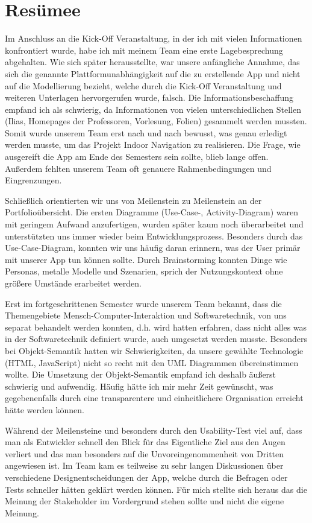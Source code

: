 \chapter{Resümee}

Im Anschluss an die Kick-Off Veranstaltung, in der ich mit vielen Informationen konfrontiert wurde, habe ich mit meinem Team eine erste Lagebesprechung abgehalten. Wie sich später herausstellte, war unsere anfängliche Annahme, das sich die genannte Plattformunabhängigkeit auf die zu erstellende App und nicht auf die Modellierung bezieht, welche durch die Kick-Off Veranstaltung und weiteren Unterlagen hervorgerufen wurde, falsch. Die Informationsbeschaffung empfand ich als schwierig, da Informationen von vielen unterschiedlichen Stellen (Ilias, Homepages der Professoren, Vorlesung, Folien) gesammelt werden mussten. Somit wurde unserem Team erst nach und nach bewusst, was genau erledigt werden musste, um das Projekt Indoor Navigation zu realisieren. Die Frage, wie ausgereift die App am Ende des Semesters sein sollte, blieb lange offen. Außerdem fehlten unserem Team oft genauere Rahmenbedingungen und Eingrenzungen.

Schließlich orientierten wir uns von Meilenstein zu Meilenstein an der Portfolioübersicht. Die ersten Diagramme (Use-Case-, Activity-Diagram) waren mit geringem Aufwand anzufertigen, wurden später kaum noch überarbeitet und unterstützten uns immer wieder beim Entwicklungsprozess. Besonders durch das Use-Case-Diagram, konnten wir uns häufig daran erinnern, was der User primär mit unserer App tun können sollte. Durch Brainstorming konnten Dinge wie Personas, metalle Modelle und Szenarien, sprich der Nutzungskontext ohne größere Umstände erarbeitet werden.

Erst im fortgeschrittenen Semester wurde unserem Team bekannt, dass die Themengebiete Mensch-Computer-Interaktion und Softwaretechnik, von uns separat behandelt werden konnten, d.h. wird hatten erfahren, dass nicht alles was in der Softwaretechnik definiert wurde, auch umgesetzt werden musste. Besonders bei Objekt-Semantik hatten wir Schwierigkeiten, da unsere gewählte Technologie (HTML, JavaScript) nicht so recht mit den UML Diagrammen übereinstimmen wollte. Die Umsetzung der Objekt-Semantik empfand ich deshalb äußerst schwierig und aufwendig. Häufig hätte ich mir mehr Zeit gewünscht, was gegebenenfalls durch eine transparentere und einheitlichere Organisation erreicht  hätte werden können.

Während der Meilensteine und besonders durch den Usability-Test viel auf, dass man als Entwickler schnell den Blick für das Eigentliche Ziel aus den Augen verliert und das man besonders auf die Unvoreingenommenheit von Dritten angewiesen ist. Im Team kam es teilweise zu sehr langen Diskussionen über verschiedene Designentscheidungen der App, welche durch die Befragen oder Tests schneller hätten geklärt werden können. Für mich stellte sich heraus das die Meinung der Stakeholder im Vordergrund stehen sollte und nicht die eigene Meinung.